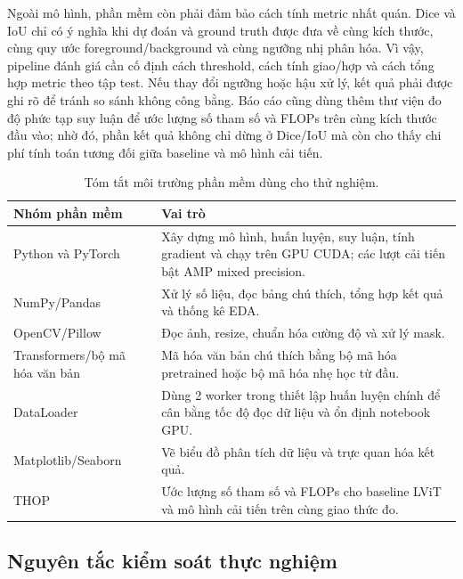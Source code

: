 Ngoài mô hình, phần mềm còn phải đảm bảo cách tính metric nhất quán. Dice và IoU chỉ có ý nghĩa khi dự đoán và ground truth được đưa về cùng kích thước, cùng quy ước foreground/background và cùng ngưỡng nhị phân hóa. Vì vậy, pipeline đánh giá cần cố định cách threshold, cách tính giao/hợp và cách tổng hợp metric theo tập test. Nếu thay đổi ngưỡng hoặc hậu xử lý, kết quả phải được ghi rõ để tránh so sánh không công bằng. Báo cáo cũng dùng thêm thư viện đo độ phức tạp suy luận để ước lượng số tham số và FLOPs trên cùng kích thước đầu vào; nhờ đó, phần kết quả không chỉ dừng ở Dice/IoU mà còn cho thấy chi phí tính toán tương đối giữa baseline và mô hình cải tiến.

\begin{table}[H]
  \centering
  \caption{Tóm tắt môi trường phần mềm dùng cho thử nghiệm.}
  \label{tab:software-env}
  \small
  \renewcommand{\arraystretch}{1.12}
  \setlength{\tabcolsep}{5pt}
  \begin{tabularx}{\textwidth}{@{}p{} X@{}}
    \toprule
    Nhóm phần mềm & Vai trò \\
    \midrule
    Python và PyTorch & Xây dựng mô hình, huấn luyện, suy luận, tính gradient và chạy trên GPU CUDA; các lượt cải tiến bật AMP mixed precision. \\
    NumPy/Pandas & Xử lý số liệu, đọc bảng chú thích, tổng hợp kết quả và thống kê EDA. \\
    OpenCV/Pillow & Đọc ảnh, resize, chuẩn hóa cường độ và xử lý mask. \\
    Transformers/bộ mã hóa văn bản & Mã hóa văn bản chú thích bằng bộ mã hóa pretrained hoặc bộ mã hóa nhẹ học từ đầu. \\
    DataLoader & Dùng 2 worker trong thiết lập huấn luyện chính để cân bằng tốc độ đọc dữ liệu và ổn định notebook GPU. \\
    Matplotlib/Seaborn & Vẽ biểu đồ phân tích dữ liệu và trực quan hóa kết quả. \\
    THOP & Ước lượng số tham số và FLOPs cho baseline LViT và mô hình cải tiến trên cùng giao thức đo. \\
    \bottomrule
  \end{tabularx}
\end{table}
\FloatBarrier

\subsection{Nguyên tắc kiểm soát thực nghiệm}

